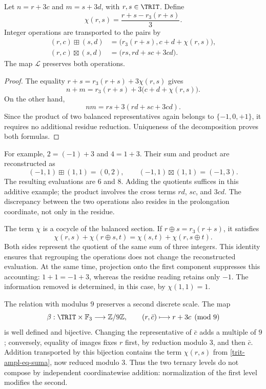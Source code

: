 \begin{proposition}
\label{trit-ampl-prop-aritmetica}
Let \(n=r+3c\) and \(m=s+3d\), with \(r,s\in\TRIT\). Define
\[
 \chi(r,s)=\frac{r+s-r_3(r+s)}3.
\]
Integer operations are transported to the pairs by
\begin{align}
 (r,c)\boxplus(s,d)
 &=\bigl(r_3(r+s),c+d+\chi(r,s)\bigr),
 \label{trit-ampl-eq-suma}\\
 (r,c)\boxtimes(s,d)
 &=\bigl(rs,rd+sc+3cd\bigr).
 \label{trit-ampl-eq-producto}
\end{align}
The map \(\mathcal L\) preserves both operations.
\end{proposition}
\begin{proof}
The equality \(r+s=r_3(r+s)+3\chi(r,s)\) gives
\[
 n+m=r_3(r+s)+3\bigl(c+d+\chi(r,s)\bigr).
\]
On the other hand,
\[
 nm=rs+3(rd+sc+3cd).
\]
Since the product of two balanced representatives again belongs to
\(\{-1,0,+1\}\), it requires no additional residue reduction. Uniqueness
of the decomposition proves both formulas.
\end{proof}

For example, \(2=(-1)+3\) and \(4=1+3\). Their sum and product are reconstructed
as
\[
 (-1,1)\boxplus(1,1)=(0,2),\qquad
 (-1,1)\boxtimes(1,1)=(-1,3).
\]
The resulting evaluations are \(6\) and \(8\). Adding the quotients suffices
in this additive example; the product involves the cross terms
\(rd\), \(sc\), and \(3cd\). The discrepancy between the two operations
also resides in the prolongation coordinate, not only in the residue.

The term \(\chi\) is a cocycle of the balanced section. If
\(r\oplus s=r_3(r+s)\), it satisfies
\[
 \chi(r,s)+\chi(r\oplus s,t)
 =\chi(s,t)+\chi(r,s\oplus t).
\]
Both sides represent the quotient of the same sum of three integers.
This identity ensures that regrouping the operations does not change the
reconstructed evaluation. At the same time, projection onto the first
component suppresses this accounting: \(1+1=-1+3\), whereas the residue
reading retains only \(-1\). The information removed is determined,
in this case, by \(\chi(1,1)=1\).

The relation with modulus \(9\) preserves a second discrete scale.
The map
\[
 \beta:\TRIT\times\mathbb F_3\longrightarrow\mathbb Z/9\mathbb Z,
 \qquad (r,\bar c)\longmapsto r+3c\pmod9
\]
is well defined and bijective. Changing the representative of \(\bar c\)
adds a multiple of \(9\); conversely, equality of images fixes
\(r\) first, by reduction modulo \(3\), and then \(\bar c\). Addition
transported by this bijection contains the term
\(\chi(r,s)\) from \eqref{trit-ampl-eq-suma}, now reduced modulo \(3\).
Thus the two ternary levels do not compose by independent coordinatewise
addition: normalization of the first level modifies the second.

